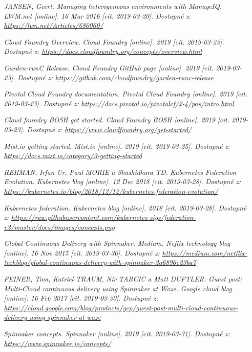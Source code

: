 \begin{thebibliography}{10}
	\emph{JANSEN, Geert. Managing heterogeneous environments with ManageIQ. LWM.net [online]. 16 Mar 2016 [cit. 2019-03-20]. Dostupné z: \url{https://lwn.net/Articles/680060/}}

	\emph{Cloud Foundry Overview. Cloud Foundry [online]. 2019 [cit. 2019-03-23]. Dostupné z: \url{https://docs.cloudfoundry.org/concepts/overview.html}}

	\emph{Garden-runC Release. Cloud Foundry GitHub page [online]. 2019 [cit. 2019-03-23]. Dostupné z: \url{https://github.com/cloudfoundry/garden-runc-release}}

	\emph{Pivotal Cloud Foundry documentation. Pivotal Cloud Foundry [online]. 2019 [cit. 2019-03-23]. Dostupné z: \url{https://docs.pivotal.io/pivotalcf/2-4/pas/intro.html}}

	\emph{Cloud foundry BOSH get started. Cloud Foundry BOSH [online]. 2019 [cit. 2019-03-23]. Dostupné z: \url{https://www.cloudfoundry.org/get-started/}}

	\emph{Mist.io getting started. Mist.io [online]. 2019 [cit. 2019-03-25]. Dostupné z: \url{https://docs.mist.io/category/3-getting-started}}

	\emph{REHMAN, Irfan Ur, Paul MORIE a Shashidhara TD. Kubernetes Federation Evolution. Kubernetes blog [online]. 12 Dec 2018 [cit. 2019-03-28]. Dostupné z: \url{https://kubernetes.io/blog/2018/12/12/kubernetes-federation-evolution/}}

	\emph{Kubernetes federation. Kubernetes blog [online]. 2018 [cit. 2019-03-28]. Dostupné z: \url{https://raw.githubusercontent.com/kubernetes-sigs/federation-v2/master/docs/images/concepts.png}}

	\emph{Global Continuous Delivery with Spinnaker. Medium, Neflix technology blog [online]. 16 Nov 2015 [cit. 2019-03-30]. Dostupné z: \url{https://medium.com/netflix-techblog/global-continuous-delivery-with-spinnaker-2a6896c23ba7}}

	\emph{FEINER, Tom, Katriel TRAUM, Nir TARCIC a Matt DUFTLER. Guest post: Multi-Cloud continuous delivery using Spinnaker at Waze. Google cloud blog [online]. 16 Feb 2017 [cit. 2019-03-30]. Dostupné z: \url{https://cloud.google.com/blog/products/gcp/guest-post-multi-cloud-continuous-delivery-using-spinnaker-at-waze}}

	\emph{Spinnaker concepts. Spinnaker [online]. 2019 [cit. 2019-03-31]. Dostupné z: \url{https://www.spinnaker.io/concepts/}}


\end{thebibliography}
